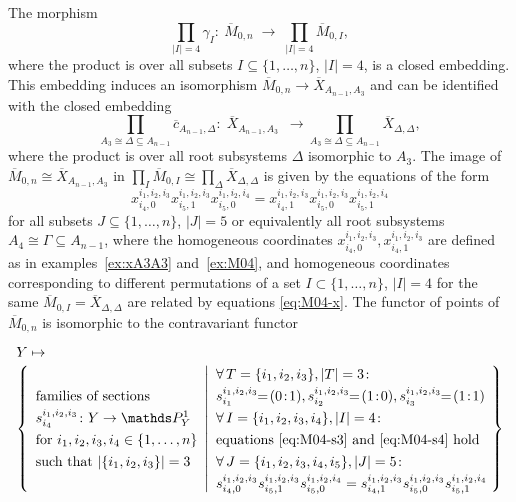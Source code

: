 \documentclass[ALCO,ThmDefs,Unicode,epreuves]{cedram}
\def\P{\mathds P}
\begin{document}
\begin{theo}\label{thm:M0n-ProdP1-functor}
The morphism
\[
\prod\limits_{|I|=4}\!\gamma_I\colon\:\overline{M}_{0,n}\;\to\;
\prod\limits_{|I|=4}\overline{M}_{0,I},
\]
where the product is over all subsets $I\subseteq\{1,\ldots,n\}$,
$|I|=4$, is a closed embedding. This embedding induces an isomorphism 
$\overline{M}_{0,n}\to\overline{X}_{A_{n-1},A_3}$ and can be identified 
with the closed embedding
\[
\prod\limits_{A_3\cong\Delta\subseteq A_{n-1}\!\!\!\!\!\!\!}\!\!\!\!\!
\overline{c}_{A_{n-1},\Delta}\colon\;
\overline{X}_{A_{n-1},A_3}\;\:\to\!
\prod\limits_{A_3\cong\Delta\subseteq A_{n-1}\!\!\!\!\!\!\!}\!\!\!\!\!
\overline{X}_{\Delta,\Delta},
\]
where the product is over all root subsystems $\Delta$ isomorphic to $A_3$.
The image of $\overline{M}_{0,n}\cong\overline{X}_{A_{n-1},A_3}$ in 
$\prod_I\overline{M}_{0,I}\cong\prod_{\Delta}\overline{X}_{\Delta,\Delta}$ 
is given by the equations of the form
\[
x^{i_1,i_2,i_3}_{i_4,0}x^{i_1,i_2,i_3}_{i_5,1}x^{i_1,i_2,i_4}_{i_5,0}
=x^{i_1,i_2,i_3}_{i_4,1}x^{i_1,i_2,i_3}_{i_5,0}x^{i_1,i_2,i_4}_{i_5,1}
\]
for all subsets $J\subseteq\{1,\ldots,n\}$, $|J|=5$ 
or equivalently all root subsystems $A_4\cong\Gamma\subseteq A_{n-1}$,
where the homogeneous coordinates $x^{i_1,i_2,i_3}_{i_4,0},x^{i_1,i_2,i_3}_{i_4,1}$
are defined as in examples~\ref{ex:xA3A3} and~\ref{ex:M04}, and homogeneous coordinates
corresponding to different permutations of a set $I\subset\{1,\ldots,n\}$, $|I|=4$ 
for the same $\overline{M}_{0,I}=\overline{X}_{\Delta,\Delta}$ are related by equations 
\eqref{eq:M04-x}.
The functor of points of $\overline{M}_{0,n}$ is isomorphic to the contravariant functor
\begin{equation}\label{eq:M0n-functor} 
\begin{array}{l}
Y\mapsto\\
\left\{
\begin{array}{l}
\text{families of sections}\\
s^{i_1,i_2,i_3}_{i_4}\colon Y\to\P^1_Y\\
\text{for $i_1,i_2,i_3,i_4\in\{1,\ldots,n\}$}\\
\text{such that $|\{i_1,i_2,i_3\}|=3$}\\
\end{array}
\!\left|
{\renewcommand{\arraystretch}{1.3}
\begin{array}{l}
\forall\,T=\{i_1,i_2,i_3\}, |T|=3\colon\\
s^{i_1,i_2,i_3}_{i_1}\!\!=\!(0\!:\!1),s^{i_1,i_2,i_3}_{i_2}\!\!=\!(1\!:\!0), 
s^{i_1,i_2,i_3}_{i_3}\!\!=\!(1\!:\!1)\\
\forall\,I=\{i_1,i_2,i_3,i_4\}, |I|=4\colon\\
\text{equations~\eqref{eq:M04-s3} and~\eqref{eq:M04-s4} hold}\\
\forall\,J=\{i_1,i_2,i_3,i_4,i_5\}, |J|=5\colon\\
s^{i_1,i_2,i_3}_{i_4,0}s^{i_1,i_2,i_3}_{i_5,1}s^{i_1,i_2,i_4}_{i_5,0}
=s^{i_1,i_2,i_3}_{i_4,1}s^{i_1,i_2,i_3}_{i_5,0}s^{i_1,i_2,i_4}_{i_5,1}
\end{array}}\!\!
\right.\right\}
\end{array}
\end{equation}
\end{theo}
\end{document}

